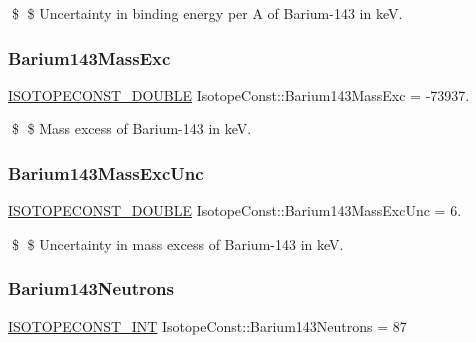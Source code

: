 \$ \$ Uncertainty in binding energy per A of Barium-\/143 in keV. \mbox{\label{group___isotope_const-_barium-_ba143_ga13565c2379d70ee1c1dcaecc3a4607fc}} 
\subsubsection{\texorpdfstring{Barium143\+Mass\+Exc}{Barium143MassExc}}
{\footnotesize\ttfamily \mbox{\hyperlink{group___isotope_const-_macros_ga8f45a7272ce02c0b4c65c44636ed719a}{I\+S\+O\+T\+O\+P\+E\+C\+O\+N\+S\+T\+\_\+\+D\+O\+U\+B\+LE}} Isotope\+Const\+::\+Barium143\+Mass\+Exc = -\/73937.}

\$ \$ Mass excess of Barium-\/143 in keV. \mbox{\label{group___isotope_const-_barium-_ba143_ga0cc12ca4da231ca6afb648cc992716ff}} 
\subsubsection{\texorpdfstring{Barium143\+Mass\+Exc\+Unc}{Barium143MassExcUnc}}
{\footnotesize\ttfamily \mbox{\hyperlink{group___isotope_const-_macros_ga8f45a7272ce02c0b4c65c44636ed719a}{I\+S\+O\+T\+O\+P\+E\+C\+O\+N\+S\+T\+\_\+\+D\+O\+U\+B\+LE}} Isotope\+Const\+::\+Barium143\+Mass\+Exc\+Unc = 6.}

\$ \$ Uncertainty in mass excess of Barium-\/143 in keV. \mbox{\label{group___isotope_const-_barium-_ba143_gac70e1d3eeee2d7200454fe2a3c586756}} 
\subsubsection{\texorpdfstring{Barium143\+Neutrons}{Barium143Neutrons}}
{\footnotesize\ttfamily \mbox{\hyperlink{group___isotope_const-_macros_ga5f18360b3e99483a35c32d789e62621c}{I\+S\+O\+T\+O\+P\+E\+C\+O\+N\+S\+T\+\_\+\+I\+NT}} Isotope\+Const\+::\+Barium143\+Neutrons = 87}

